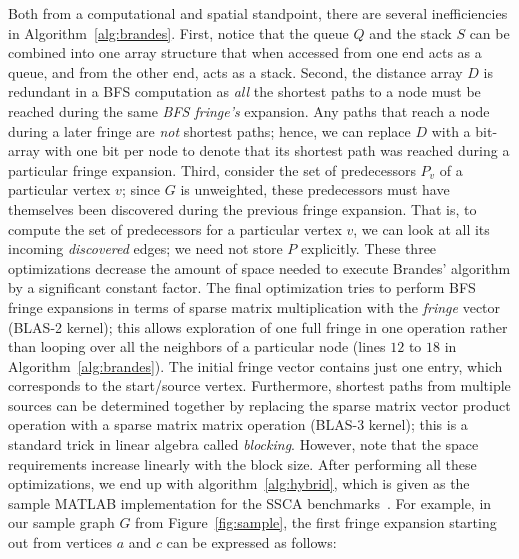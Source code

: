 %
Both from a computational and spatial standpoint, there are several
inefficiencies in Algorithm~\ref{alg:brandes}.
%
First, notice that the queue $Q$ and the stack $S$ can be combined into one
array structure that when accessed from one end acts as a queue, and from the
other end, acts as a stack.
%
Second, the distance array $D$ is redundant in a BFS computation as
\textit{all} the shortest paths to a node must be reached during the same
\textit{BFS fringe's} expansion.
%
Any paths that reach a node during a later fringe are \textit{not} shortest
paths; hence, we can replace $D$ with a bit-array with one bit per node to
denote that its shortest path was reached during a particular fringe
expansion.
%
Third, consider the set of predecessors $P_v$ of a particular vertex $v$; since
$G$ is unweighted, these predecessors must have themselves been discovered 
during the previous fringe expansion.
%
That is, to compute the set of predecessors for a particular vertex $v$, we can
look at all its incoming \textit{discovered} edges; we need not store $P$ 
explicitly.
%
These three optimizations decrease the amount of space needed to execute
Brandes' algorithm by a significant constant factor.
%
The final optimization tries to perform BFS fringe expansions in terms of
sparse matrix multiplication with the \textit{fringe} vector (BLAS-2 kernel);
this allows exploration of one full fringe in one operation rather than
looping over all the neighbors of a particular node (lines $12$ to $18$ in
Algorithm~\ref{alg:brandes}).
%
The initial fringe vector contains just one entry, which corresponds to the 
start/source vertex.
%
Furthermore, shortest paths from multiple sources can be determined together by
replacing the sparse matrix vector product operation with a sparse matrix
matrix operation (BLAS-3 kernel); this is a standard trick in linear algebra
called \textit{blocking}.
%
However, note that the space requirements increase linearly with the block 
size.
%
After performing all these optimizations, we end up with
algorithm~\ref{alg:hybrid}, which is given as the sample MATLAB implementation
for the SSCA benchmarks~\cite{ssca_matlab}.
%
For example, in our sample graph $G$ from Figure~\ref{fig:sample}, the first 
fringe expansion starting out from vertices $a$ and $c$ can be expressed as
follows:

